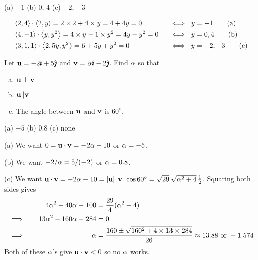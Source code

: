 %

\begin{answer}
(a) $-1$\qquad
(b) $0$, $4$\qquad
(c) $-2$, $-3$
\end{answer}

\begin{solution}
\leqnomode
\begin{alignat*}{3}
&\left< 2,4\right> \cdot\left< 2,y\right> =2\times2+4\times y=4+4y=0
   &&\ \iff\  y=-1
\tag{a} \\
&\left< 4,-1\right> \cdot\left< y,y^2\right> =4\times y-1\times y^2=4y-y^2=0
   &&\ \iff\  y=0,4
\tag{b} \\
&\left< 3,1,1\right> \cdot\left< 2,5y,y^2\right> 
  =6+5y+y^2=0
   &&\ \iff\  y=-2,-3
\tag{c}
\end{alignat*}
\reqnomode
\end{solution}

\begin{question}
Let $\mathbf{u}=-2\hat{\pmb{\imath}}+5\hat{\pmb{\jmath}}$ and $\mathbf{v}=\alpha\hat{\pmb{\imath}}-2\hat{\pmb{\jmath}}$. Find $\alpha$ so that
\begin{enumerate}[(a)]
\item
   $\mathbf{u}\perp\mathbf{v}$
\item
   $\mathbf{u} \| \mathbf{v}$
\item
   The angle between $\mathbf{u}$ and $\mathbf{v}$ is $60^\circ$.
\end{enumerate}
\end{question}

%

\begin{answer}
(a) $-5$\qquad
(b) $0.8$\qquad
(c) none
\end{answer}

\begin{solution}
(a) 
   We want $0=\mathbf{u}\cdot\mathbf{v}=-2\alpha-10$ or $\alpha=-5$.

(b) 
   We want $-2/\alpha=5/(-2)$ or $\alpha=0.8$.

(c) 
   We want $\mathbf{u}\cdot\mathbf{v}=-2\alpha-10
             =|\mathbf{u}|\,|\mathbf{v}|\,\cos 60^\circ
             =\sqrt{29}\,\sqrt{\alpha^2+4}\,\tfrac{1}{2}$. Squaring both sides gives
\begin{alignat*}{3}
& & 4\alpha^2+40\alpha+100&=\frac{29}{4}(\alpha^2+4) \\
&\implies\quad &  13\alpha^2-160\alpha-284&=0 \\
&\implies\quad & \alpha &=\frac{160\pm\sqrt{160^2+4\times13\times284}}{26}
\approx 13.88\text{ or }-1.574
\end{alignat*}
Both of these $\alpha$'s give $\mathbf{u}\cdot\mathbf{v}<0$ so no $\alpha$ works.
\end{solution}

